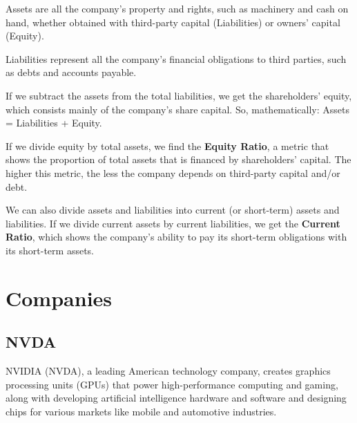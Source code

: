 \documentclass[
]{book}
\begin{document}
Assets are all the company's property and rights, such as machinery and cash on hand, whether obtained with third-party capital (Liabilities) or owners' capital (Equity).

Liabilities represent all the company's financial obligations to third parties, such as debts and accounts payable.

If we subtract the assets from the total liabilities, we get the shareholders' equity, which consists mainly of the company's share capital. So, mathematically: Assets = Liabilities + Equity.

If we divide equity by total assets, we find the \textbf{Equity Ratio}, a metric that shows the proportion of total assets that is financed by shareholders' capital. The higher this metric, the less the company depends on third-party capital and/or debt.

We can also divide assets and liabilities into current (or short-term) assets and liabilities. If we divide current assets by current liabilities, we get the \textbf{Current Ratio}, which shows the company's ability to pay its short-term obligations with its short-term assets.

\hypertarget{companies}{%
\chapter{Companies}\label{companies}}

\hypertarget{nvda}{%
\section{NVDA}\label{nvda}}

NVIDIA (NVDA), a leading American technology company, creates graphics processing units (GPUs) that power high-performance computing and gaming, along with developing artificial intelligence hardware and software and designing chips for various markets like mobile and automotive industries.
\end{document}
